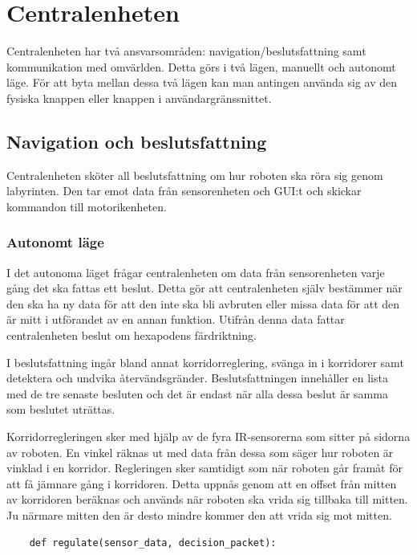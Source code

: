 \documentclass[a4paper,titlepage,12pt]{article}
\begin{document}
	\section{Centralenheten}
        Centralenheten har två ansvarsområden: navigation/beslutsfattning samt
        kommunikation med omvärlden. Detta görs i två lägen, manuellt och autonomt
        läge. För att byta mellan dessa två lägen kan man antingen använda sig av den
        fysiska knappen eller knappen i användargränssnittet.

	\subsection{Navigation och beslutsfattning}
	Centralenheten sköter all beslutsfattning om hur roboten ska röra sig
	genom labyrinten. Den tar emot data från sensorenheten och GUI:t och
	skickar kommandon till motorikenheten.
  
	\subsubsection{Autonomt läge}
	\label{sec:central-autonom} 
	I det autonoma läget frågar centralenheten om data från sensorenheten
    varje gång det ska fattas ett beslut. Detta gör att centralenheten själv
    bestämmer när den ska ha ny data för att den inte ska bli avbruten eller missa
    data för att den är mitt i utförandet av en annan funktion. Utifrån denna data
    fattar centralenheten beslut om hexapodens färdriktning.

    I beslutsfattning ingår bland annat korridorreglering, svänga in i korridorer samt detektera
    och undvika återvändsgränder. Beslutsfattningen innehåller en lista med de tre senaste besluten och det är endast när alla dessa beslut är samma som beslutet uträttas. 
    
    Korridorregleringen sker med hjälp av de fyra IR-sensorerna som sitter på
    sidorna av roboten. En vinkel räknas ut med data från dessa som säger
    hur roboten är vinklad i en korridor. Regleringen sker samtidigt som när
    roboten går framåt för att få jämnare gång i korridoren. Detta uppnås genom
    att en offset från mitten av korridoren beräknas och används när roboten ska
    vrida sig tillbaka till mitten. Ju närmare mitten den är desto mindre kommer
    den att vrida sig mot mitten.

    \begin{lstlisting}
    def regulate(sensor_data, decision_packet):
    \end{lstlisting}
\end{document}

